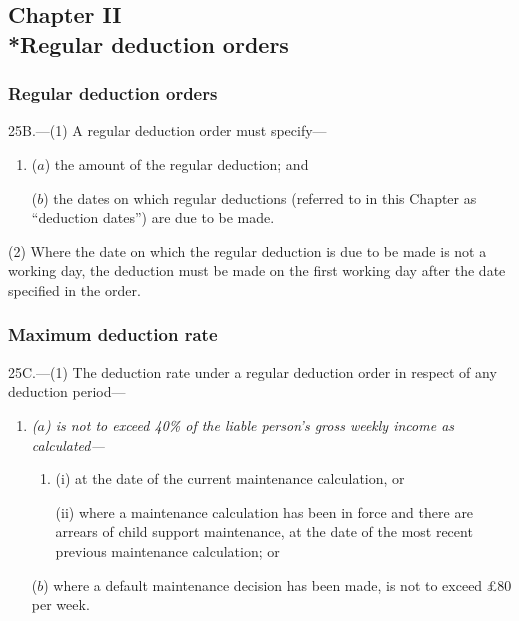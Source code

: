 \documentclass[12pt,a4paper]{article}
\begin{document}

\subsection[Chapter II --- Regular deduction orders]{Chapter II\\*Regular deduction orders}

\renewcommand\parthead{--- Part IIIA Chapter II}

\subsubsection[25B. Regular deduction orders]{Regular deduction orders}

25B.---(1)  A regular deduction order must specify—
\begin{enumerate}\item[]
($a$) the amount of the regular deduction; and

($b$) the dates on which regular deductions (referred to in this Chapter as “deduction dates”) are due to be made.
\end{enumerate}

(2) Where the date on which the regular deduction is due to be made is not a working day, the deduction must be made on the first working day after the date specified in the order.

\subsubsection[25C. Maximum deduction rate]{Maximum deduction rate}

25C.---(1)  The deduction rate under a regular deduction order in respect of any deduction period—
\begin{enumerate}\item[]
\emph{
($a$) is not to exceed 40\% of the liable person’s 
gross  %
weekly income 
as calculated—}
\begin{enumerate}\item[]
(i) at the date of the current maintenance calculation, or

(ii) where a maintenance calculation has been in force and there are arrears of child support maintenance, at the date of the most recent previous maintenance calculation; or
\end{enumerate}

($b$) where a default maintenance decision has been made, is not to exceed £80 per week.
\end{enumerate}
\end{document}
